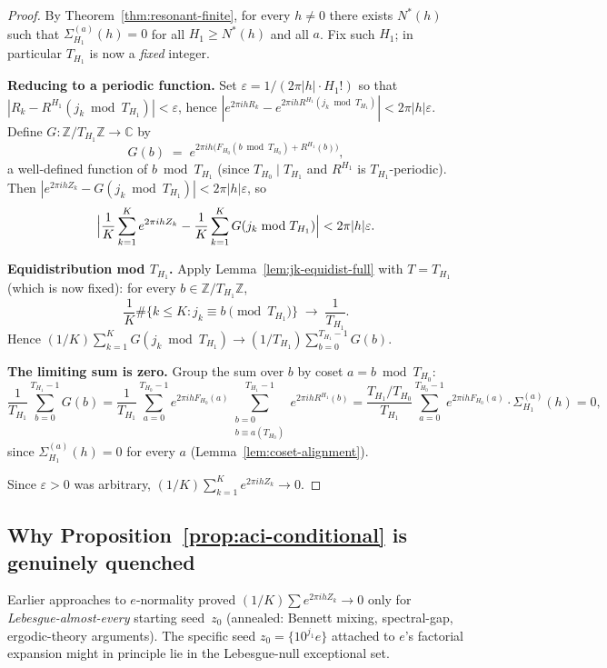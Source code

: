\documentclass[
]{article}
\begin{document}
\begin{proof}
By Theorem~\ref{thm:resonant-finite}, for every $h\ne 0$ there exists $N^*(h)$
such that $\Sigma_{H_1}^{(a)}(h)=0$ for all $H_1\ge N^*(h)$ and all $a$.
Fix such $H_1$; in particular $T_{H_1}$ is now a \emph{fixed} integer.

\medskip\noindent\textbf{Reducing to a periodic function.}
Set $\varepsilon = 1/(2\pi|h|\cdot H_1!)$ so that
$|R_k - R^{H_1}(j_k\bmod T_{H_1})| < \varepsilon$, hence
$|e^{2\pi ih R_k} - e^{2\pi ih R^{H_1}(j_k\bmod T_{H_1})}| < 2\pi|h|\varepsilon$.
Define $G:\mathbb{Z}/T_{H_1}\mathbb{Z}\to\mathbb{C}$ by
\[
  G(b) \;=\; e^{2\pi ih\bigl(F_{H_0}(b\bmod T_{H_0})+R^{H_1}(b)\bigr)},
\]
a well-defined function of $b\bmod T_{H_1}$ (since $T_{H_0}\mid T_{H_1}$
and $R^{H_1}$ is $T_{H_1}$-periodic).
Then $|e^{2\pi ih Z_k} - G(j_k\bmod T_{H_1})| < 2\pi|h|\varepsilon$, so
\[
  \Bigl|\frac{1}{K}\sum_{k=1}^K e^{2\pi ih Z_k}
  - \frac{1}{K}\sum_{k=1}^K G(j_k\bmod T_{H_1})\Bigr| < 2\pi|h|\varepsilon.
\]

\medskip\noindent\textbf{Equidistribution mod $T_{H_1}$.}
Apply Lemma~\ref{lem:jk-equidist-full} with $T = T_{H_1}$ (which is now fixed):
for every $b\in\mathbb{Z}/T_{H_1}\mathbb{Z}$,
\[
  \frac{1}{K}\#\{k\le K : j_k\equiv b\pmod{T_{H_1}}\}\;\to\;\frac{1}{T_{H_1}}.
\]
Hence $(1/K)\sum_{k=1}^K G(j_k\bmod T_{H_1})\to (1/T_{H_1})\sum_{b=0}^{T_{H_1}-1}G(b)$.

\medskip\noindent\textbf{The limiting sum is zero.}
Group the sum over $b$ by coset $a = b\bmod T_{H_0}$:
\[
  \frac{1}{T_{H_1}}\sum_{b=0}^{T_{H_1}-1}G(b)
  = \frac{1}{T_{H_1}}\sum_{a=0}^{T_{H_0}-1}e^{2\pi ih F_{H_0}(a)}
    \sum_{\substack{b=0\\b\equiv a(T_{H_0})}}^{T_{H_1}-1}e^{2\pi ih R^{H_1}(b)}
  = \frac{T_{H_1}/T_{H_0}}{T_{H_1}}\sum_{a=0}^{T_{H_0}-1}e^{2\pi ih F_{H_0}(a)}
    \cdot\Sigma_{H_1}^{(a)}(h)
  = 0,
\]
since $\Sigma_{H_1}^{(a)}(h)=0$ for every $a$
(Lemma~\ref{lem:coset-alignment}).

Since $\varepsilon>0$ was arbitrary, $(1/K)\sum_{k=1}^K e^{2\pi ih Z_k}\to 0$.
\end{proof}

\subsection{Why Proposition~\ref{prop:aci-conditional} is genuinely quenched}
\label{sec:why-quenched}

Earlier approaches to $e$-normality proved $(1/K)\sum e^{2\pi ihZ_k}\to 0$
only for \emph{Lebesgue-almost-every} starting seed~$z_0$
(annealed: Bennett mixing, spectral-gap, ergodic-theory arguments).
The specific seed $z_0 = \{10^{j_1}e\}$ attached to $e$'s factorial
expansion might in principle lie in the Lebesgue-null exceptional set.
\end{document}
